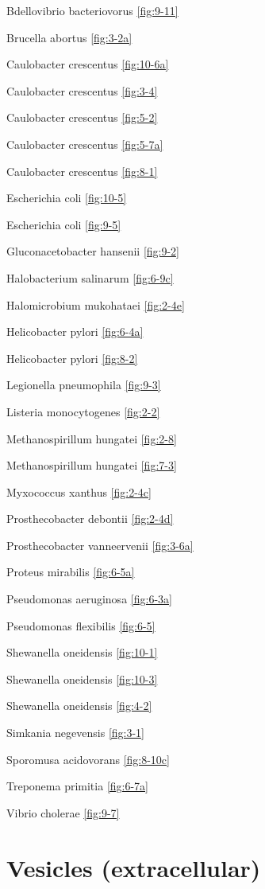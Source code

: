 \documentclass[]{tufte-book}
\begin{document}
Bdellovibrio bacteriovorus \ref{fig:9-11}

Brucella abortus \ref{fig:3-2a}

Caulobacter crescentus \ref{fig:10-6a}

Caulobacter crescentus \ref{fig:3-4}

Caulobacter crescentus \ref{fig:5-2}

Caulobacter crescentus \ref{fig:5-7a}

Caulobacter crescentus \ref{fig:8-1}

Escherichia coli \ref{fig:10-5}

Escherichia coli \ref{fig:9-5}

Gluconacetobacter hansenii \ref{fig:9-2}

Halobacterium salinarum \ref{fig:6-9c}

Halomicrobium mukohataei \ref{fig:2-4e}

Helicobacter pylori \ref{fig:6-4a}

Helicobacter pylori \ref{fig:8-2}

Legionella pneumophila \ref{fig:9-3}

Listeria monocytogenes \ref{fig:2-2}

Methanospirillum hungatei \ref{fig:2-8}

Methanospirillum hungatei \ref{fig:7-3}

Myxococcus xanthus \ref{fig:2-4c}

Prosthecobacter debontii \ref{fig:2-4d}

Prosthecobacter vanneervenii \ref{fig:3-6a}

Proteus mirabilis \ref{fig:6-5a}

Pseudomonas aeruginosa \ref{fig:6-3a}

Pseudomonas flexibilis \ref{fig:6-5}

Shewanella oneidensis \ref{fig:10-1}

Shewanella oneidensis \ref{fig:10-3}

Shewanella oneidensis \ref{fig:4-2}

Simkania negevensis \ref{fig:3-1}

Sporomusa acidovorans \ref{fig:8-10c}

Treponema primitia \ref{fig:6-7a}

Vibrio cholerae \ref{fig:9-7}

\hypertarget{vesicles-extracellular}{%
\section*{Vesicles (extracellular)}\label{vesicles-extracellular}}
\end{document}
